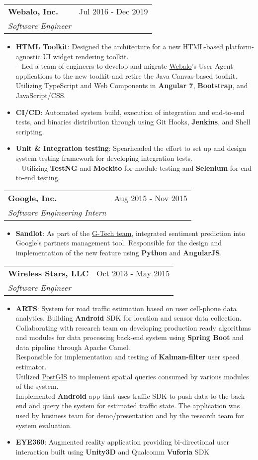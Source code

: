 \documentclass[letterpaper,11pt]{article}
\makeatletter
\newcommand{\resumeItem}[2]{
  \item\small{
    \textbf{#1}{: #2 \vspace{-2pt}}
  }
}
\newcommand{\resumeSubheading}[4]{
  \vspace{-1pt}\item
    \begin{tabular*}{0.97\textwidth}[t]{l@{\extracolsep{\fill}}r}
      \textbf{#1} & #2 \\
      \textit{\small #3} & \textit{\small #4} \\
    \end{tabular*}\vspace{-5pt}
}
\newcommand{\resumeItemListStart}{\begin{itemize}}
\newcommand{\resumeItemListEnd}{\end{itemize}\vspace{-5pt}}
\makeatother
\begin{document}
    \resumeSubheading
      {Webalo, Inc.}{Jul 2016 - Dec 2019}
      {Software Engineer}{}
      \resumeItemListStart
        \resumeItem{HTML Toolkit}
          {Designed the architecture for a new HTML-based platform-agnostic UI widget rendering toolkit.\\
          -- Led a team of engineers to develop and migrate \href{https://www.webalo.com}{Webalo}'s User Agent applications to the new toolkit and retire the Java Canvas-based toolkit.
          Utilizing TypeScript and Web Components in \textbf{Angular 7}, \textbf{Bootstrap}, and JavaScript/CSS.}
        \resumeItem{CI/CD}
          {Automated system build, execution of integration and end-to-end tests, and binaries distribution through using Git Hooks, \textbf{Jenkins}, and Shell scripting.}
        \resumeItem{Unit \& Integration testing}
          {Spearheaded the effort to set up and design system testing framework for developing integration tests.\\
          -- Utilizing \textbf{TestNG} and \textbf{Mockito} for module testing and \textbf{Selenium} for end-to-end testing.}
      \resumeItemListEnd

    \resumeSubheading
      {Google, Inc.}{Aug 2015 - Nov 2015}
      {Software Engineering Intern}{}
      \resumeItemListStart
        \resumeItem{Sandlot}
          {As part of the \href{https://careersonair.withgoogle.com/events/insidegtech}{G-Tech team}, integrated sentiment prediction into Google's partners management tool. Responsible for the design and implementation of the new feature using \textbf{Python} and \textbf{AngularJS}.}
      \resumeItemListEnd
      
\pagebreak

    \resumeSubheading
      {Wireless Stars, LLC}{Oct 2013 - May 2015}
      {Software Engineer}{}
      \resumeItemListStart
        \resumeItem{ARTS}
          {System for road traffic estimation based on user cell-phone data analytics. Building \textbf{Android} SDK for location and sensor data collection.\\
          Collaborating with research team on developing production ready algorithms and modules for data processing back-end system using \textbf{Spring Boot} and data pipeline through Apache Camel.\\
          Responsible for implementation and testing of \textbf{Kalman-filter} user speed estimator.\\
          Utilized \href{https://postgis.net/}{PostGIS} to implement spatial queries consumed by various modules of the system.\\
          Implemented \textbf{Android} app that uses traffic SDK to push data to the back-end and query the system for estimated traffic state. The application was used by business team for demo/presentation and by the research team for system evaluation.}
        \resumeItem{EYE360}
          {Augmented reality application providing bi-directional user interaction built using \textbf{Unity3D} and Qualcomm \textbf{Vuforia} SDK}
      \resumeItemListEnd
\end{document}
